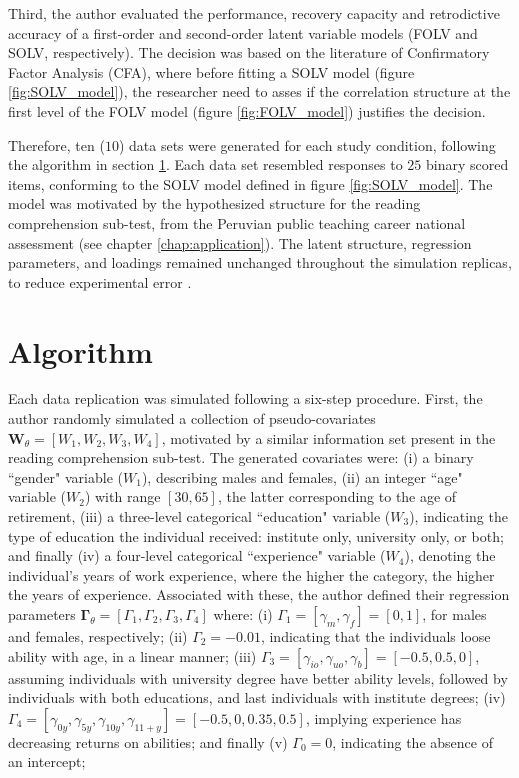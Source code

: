 Third, the author evaluated the performance, recovery capacity and retrodictive accuracy of a first-order and second-order latent variable models (FOLV and SOLV, respectively). The decision was based on the literature of Confirmatory Factor Analysis (CFA), where before fitting a SOLV model (figure \ref{fig:SOLV_model}), the researcher need to asses if the correlation structure at the first level of the FOLV model (figure \ref{fig:FOLV_model}) justifies the decision.

Therefore, ten ($10$) data sets were generated for each study condition, following the algorithm in section \ref{sect:algorithm}. Each data set resembled responses to $25$ binary scored items, conforming to the SOLV model defined in figure \ref{fig:SOLV_model}. The model was motivated by the hypothesized structure for the reading comprehension sub-test, from the Peruvian public teaching career national assessment (see chapter \ref{chap:application}). The latent structure, regression parameters, and loadings remained unchanged throughout the simulation replicas, to reduce experimental error \cite{Kieftenbeld_et_al_2012}. 


\section{Algorithm} \label{sect:algorithm}

Each data replication was simulated following a six-step procedure. First, the author randomly simulated a collection of pseudo-covariates $\mathbf{W}_{\theta} = [ W_{1}, W_{2}, W_{3}, W_{4} ]$, motivated by a similar information set present in the reading comprehension sub-test. The generated covariates were: (i) a binary ``gender" variable ($W_{1}$), describing males and females, (ii) an integer ``age" variable ($W_{2}$) with range $[30, 65]$, the latter corresponding to the age of retirement, (iii) a three-level categorical ``education" variable ($W_{3}$), indicating the type of education the individual received: institute only, university only, or both; and finally (iv) a four-level categorical ``experience" variable ($W_{4}$), denoting the individual's years of work experience, where the higher the category, the higher the years of experience. Associated with these, the author defined their regression parameters $\mathbf{\Gamma}_{\theta} = [\Gamma_{1}, \Gamma_{2}, \Gamma_{3}, \Gamma_{4}]$ where: (i) $\Gamma_{1} = [\gamma_{m}, \gamma_{f}] = [0, 1]$, for males and females, respectively; (ii) $\Gamma_{2} = -0.01$, indicating that the individuals loose ability with age, in a linear manner; (iii) $\Gamma_{3} = [\gamma_{io}, \gamma_{uo}, \gamma_{b}] = [-0.5, 0.5, 0]$, assuming individuals with university degree have better ability levels, followed by individuals with both educations, and last individuals with institute degrees; (iv) $\Gamma_{4} = [\gamma_{0y}, \gamma_{5y}, \gamma_{10y}, \gamma_{11+y}] = [-0.5, 0, 0.35, 0.5]$, implying experience has decreasing returns on abilities; and finally (v) $\Gamma_{0} = 0$, indicating the absence of an intercept;  

